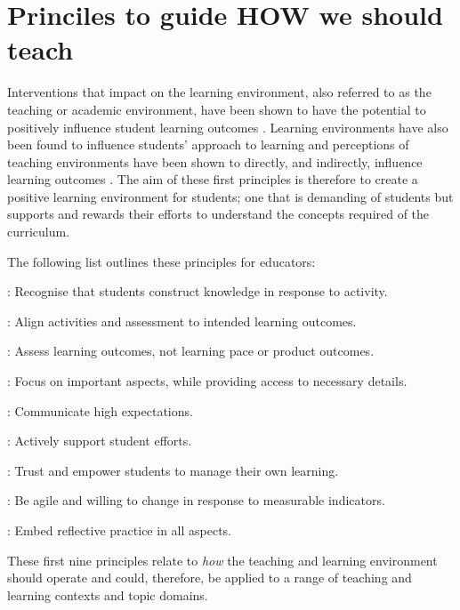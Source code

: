 \clearpage


\section{Princiles to guide HOW we should teach} %
\label{sub:principles_for_how_the_environment_should_operate}

Interventions that impact on the learning environment, also referred to as the teaching or academic environment, have been shown to have the potential to positively influence student learning outcomes \cite{Trigwell:1991}. Learning environments have also been found to influence students' approach to learning \cite{Entwistle:1990,Entwistle:1991,Kember:2007} and perceptions of teaching environments have been shown to directly, and indirectly, influence learning outcomes \cite{Meyer:1990,Lizzio:2002}. The aim of these first principles is therefore to create a positive learning environment for students; one that is demanding of students but supports and rewards their efforts to understand the concepts required of the curriculum. 

The following list outlines these principles for educators:
\begin{description}
	\item [\Pref{itm:construct}]: Recognise that students construct knowledge in response to activity.
	\item [\Pref{itm:align}]: Align activities and assessment to intended learning outcomes.
	\item [\Pref{itm:formative}]: Assess learning outcomes, not learning pace or product outcomes. 
	\item [\Pref{itm:focus}]: Focus on important aspects, while providing access to necessary details.
	\item [\Pref{itm:expectations}]: Communicate high expectations.
	\item [\Pref{itm:support}]: Actively support student efforts.
	\item [\Pref{itm:theory_y}]: Trust and empower students to manage their own learning.
	\item [\Pref{itm:agile}]: Be agile and willing to change in response to measurable indicators.
	\item [\Pref{itm:reflect}]: Embed reflective practice in all aspects.
\end{description}

These first nine principles relate to \emph{how} the teaching and learning environment should operate and could, therefore, be applied to a range of teaching and learning contexts and topic domains.

